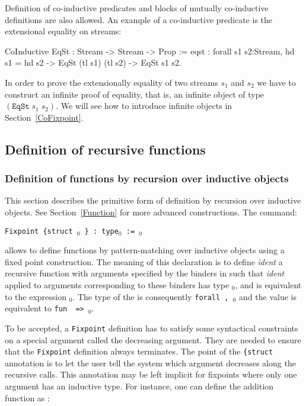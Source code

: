 Definition of co-inductive predicates and blocks of mutually
co-inductive definitions are also allowed. An example of a
co-inductive predicate is the extensional equality on streams:

\begin{coq_example}
CoInductive EqSt : Stream -> Stream -> Prop :=
    eqst :
      forall s1 s2:Stream,
        hd s1 = hd s2 -> EqSt (tl s1) (tl s2) -> EqSt s1 s2.
\end{coq_example}

In order to prove the extensionally equality of two streams $s_1$ and
$s_2$ we have to construct an infinite proof of equality, that is,
an infinite object of type $(\texttt{EqSt}\;s_1\;s_2)$. We will see
how to introduce infinite objects in Section~\ref{CoFixpoint}.

\subsection{Definition of recursive functions}

\subsubsection{Definition of functions by recursion over inductive objects}

This section describes the primitive form of definition by recursion
over inductive objects. See Section~\ref{Function} for more advanced
constructions. The command:
\begin{center}
  \texttt{Fixpoint {\ident} {\params} {\tt \{struct}
  \ident$_0$ {\tt \}} : type$_0$ := \term$_0$ 
  \label{Fixpoint}}
\end{center}
allows to define functions by pattern-matching over inductive objects 
using a fixed point construction.
The meaning of this declaration is to define {\it ident} a recursive
function with arguments specified by the binders in {\params} such
that {\it ident} applied to arguments corresponding to these binders
has type \type$_0$, and is equivalent to the expression \term$_0$. The
type of the {\ident} is consequently {\tt forall {\params} {\tt,}
  \type$_0$} and the value is equivalent to {\tt fun {\params} {\tt
    =>} \term$_0$}.

To be accepted, a {\tt Fixpoint} definition has to satisfy some
syntactical constraints on a special argument called the decreasing
argument. They are needed to ensure that the {\tt Fixpoint} definition
always terminates. The point of the {\tt \{struct \ident {\tt \}}}
annotation is to let the user tell the system which argument decreases
along the recursive calls. This annotation may be left implicit for
fixpoints where only one argument has an inductive type. For instance,
one can define the addition function as :

